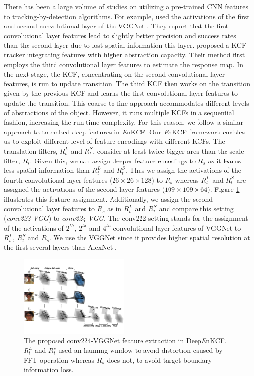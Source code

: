 \documentclass[10pt,twocolumn,letterpaper]{article}
\begin{document}
There has been a large volume of studies on utilizing a pre-trained
CNN features to tracking-by-detection algorithms. For example,
\cite{danelljan2015convolutional} used the activations of the first
and second convolutional layer of the VGGNet \cite{simonyan2014very}.
They report that the first convolutional layer features lead to
slightly better precision and success rates than the second layer due
to lost spatial information this layer. \cite{ma2015hierarchical}
proposed a KCF tracker integrating features with higher abstraction
capacity.  Their method first employs the third convolutional layer
features to estimate the response map. In the next stage, the KCF,
concentrating on the second convolutional layer features, is run to
update transition. The third KCF then works on the transition given by
the previous KCF and learns the first convolutional layer features to
update the transition. This coarse-to-fine approach accommodates
different levels of abstractions of the object. However, it runs
multiple KCFs in a sequential fashion, increasing the run-time
complexity. For this reason, we follow a similar approach to
\cite{danelljan2015convolutional} to embed deep features in {\it
  E}nKCF. Our {\it E}nKCF framework enables us to exploit different
level of feature encodings with different KCFs. The translation
filters, $R_{t}^{L}$ and $R_{t}^{S}$, consider at least twice bigger
area than the scale filter, $R_{s}$. Given this, we can assign deeper
feature encodings to $R_{s}$ as it learns less spatial information
than $R_{t}^{L}$ and $R_{t}^{S}$. Thus we assign the activations of
the fourth convolutional layer features ($26\times26\times128$) to
$R_{s}$ whereas $R_{t}^{L}$ and $R_{t}^{S}$ are assigned the
activations of the second layer features
($109\times109\times64$). Figure \ref{fig:Filters_CNN} illustrates
this feature assignment. Additionally, we assign the second
convolutional layer features to $R_{s}$ as in $R_{t}^{L}$ and
$R_{t}^{S}$ and compare this setting (\textit{conv222-VGG}) to
\textit{conv224-VGG}. The conv222 setting stands for the assignment of 
the activations of $2^{th}$, $2^{th}$ and $4^{th}$ convolutional layer features
of VGGNet to $R_{t}^{L}$, $R_{t}^{S}$ and $R_{s}$. We use the VGGNet 
since it provides higher spatial resolution at the first several layers than AlexNet
\cite{krizhevsky2012imagenet}.

\begin{figure}[!h]
\centering
\includegraphics[width=0.48\textwidth]{./figures/Filters_Details_CNN.pdf}
\caption{The proposed conv224-VGGNet feature extraction in Deep{\it E}nKCF. $R_{t}^{L}$ and $R_{t}^{s}$ used an hanning window to avoid distortion caused by FFT operation whereas $R_{s}$ does not, to avoid target boundary information loss.}
\label{fig:Filters_CNN}
\end{figure}
\end{document}
